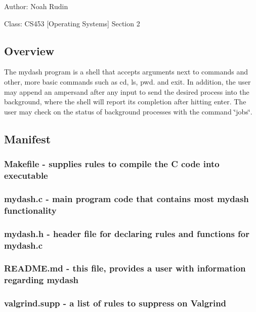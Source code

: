 
\begin{DoxyItemize}
\item Author\-: Noah Rudin
\item Class\-: C\-S453 \mbox{[}Operating Systems\mbox{]} Section 2
\end{DoxyItemize}

\subsection*{Overview}

The mydash program is a shell that accepts arguments next to commands and other, more basic commands such as cd, ls, pwd. and exit. In addition, the user may append an ampersand after any input to send the desired process into the background, where the shell will report its completion after hitting enter. The user may check on the status of background processes with the command \char`\"{}jobs\char`\"{}.

\subsection*{Manifest}

\subsubsection*{Makefile -\/ supplies rules to compile the C code into executable}

\subsubsection*{mydash.\-c -\/ main program code that contains most mydash functionality}

\subsubsection*{mydash.\-h -\/ header file for declaring rules and functions for mydash.\-c}

\subsubsection*{R\-E\-A\-D\-M\-E.\-md -\/ this file, provides a user with information regarding mydash}

\subsubsection*{valgrind.\-supp -\/ a list of rules to suppress on Valgrind}

